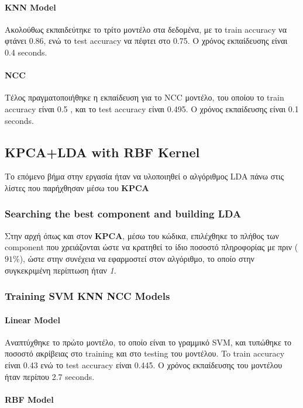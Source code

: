 \paragraph{KNN Model}
Ακολούθως εκπαιδεύτηκε το τρίτο μοντέλο στα δεδομένα, με το train accuracy να φτάνει 0.86, ενώ το test accuracy να πέφτει στο 0.75. Ο χρόνος εκπαίδευσης είναι 0.4 seconds.
\paragraph{NCC}
Τέλος πραγματοποιήθηκε η εκπαίδευση για το NCC μοντέλο, του οποίου το train accuracy είναι 0.5 , και το test accuracy είναι 0.495. Ο χρόνος εκπαίδευσης είναι 0.1 seconds.
\subsection{KPCA+LDA with RBF Kernel}

Το επόμενο βήμα στην εργασία ήταν να υλοποιηθεί ο αλγόριθμος LDA πάνω στις λίστες που παρήχθησαν μέσω του \textbf{KPCA}
\subsubsection{Searching the best component  and building LDA  }

Στην αρχή όπως και στον \textbf{KPCA}, μέσω του κώδικα, επιλέχθηκε το πλήθος των component που χρειάζονται ώστε να κρατηθεί το ίδιο ποσοστό πληροφορίας με πριν ($91\%$), ώστε στην συνέχεια να εφαρμοστεί στον αλγόριθμο, το οποίο στην συγκεκριμένη περίπτωση ήταν \emph{1}.

\subsubsection{Training SVM KNN NCC Models}

\paragraph{Linear Model}

Αναπτύχθηκε το πρώτο μοντέλο, το οποίο είναι το γραμμικό SVM, και
τυπώθηκε το ποσοστό ακρίβειας στο training και στο testing του μοντέλου. To train accuracy είναι 0.43 ενώ το test accuracy είναι 0.445. Ο χρόνος εκπαίδευσης του μοντέλου ήταν περίπου 2.7 seconds.

\paragraph{RBF Model}

